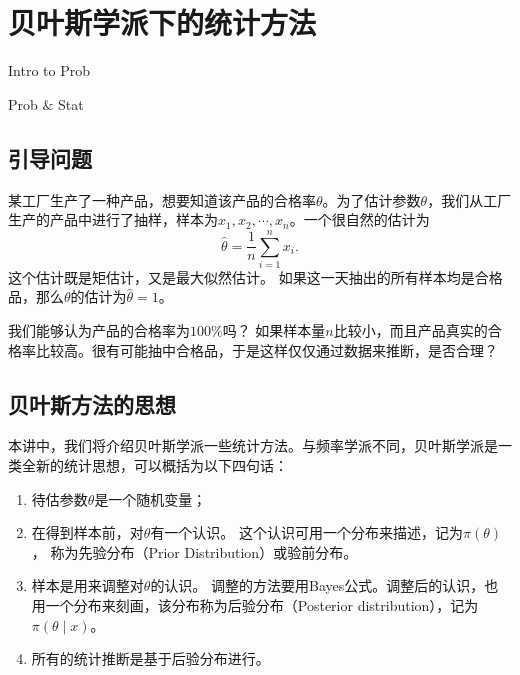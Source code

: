 \chapter{贝叶斯学派下的统计方法}
\begin{introduction}
  \item Intro to Prob  
  \item Prob $\&$ Stat
\end{introduction}
\section{引导问题}
\begin{example}
     某工厂生产了一种产品，想要知道该产品的合格率$\theta$。为了估计参数$\theta$，我们从工厂生产的产品中进行了抽样，样本为$x_1,x_2,\cdots,x_n$。一个很自然的估计为
    $$
    \hat{\theta} = \frac{1}{n}\sum_{i=1}^n x_i.
    $$
    这个估计既是矩估计，又是最大似然估计。
    如果这一天抽出的所有样本均是合格品，那么$\theta$的估计为$\hat{\theta} = 1$。
\end{example}
  \begin{problem}
   我们能够认为产品的合格率为$100\%$吗？ 如果样本量$n$比较小，而且产品真实的合格率比较高。很有可能抽中合格品，于是这样仅仅通过数据来推断，是否合理？
    \end{problem}    

\section{贝叶斯方法的思想}
本讲中，我们将介绍贝叶斯学派一些统计方法。与频率学派不同，贝叶斯学派是一类全新的统计思想，可以概括为以下四句话：
\begin{enumerate}
    \item 待估参数$\theta$是一个随机变量；
    \item 在得到样本前，对$\theta$有一个认识。
这个认识可用一个分布来描述，记为$\pi(\theta)$，
 称为先验分布（Prior Distribution）或验前分布。
    \item 样本是用来调整对$\theta$的认识。
    调整的方法要用Bayes公式。调整后的认识，也用一个分布来刻画，该分布称为后验分布（Posterior  distribution），记为$\pi(\theta \mid x)$。
    \item 所有的统计推断是基于后验分布进行。
\end{enumerate}
